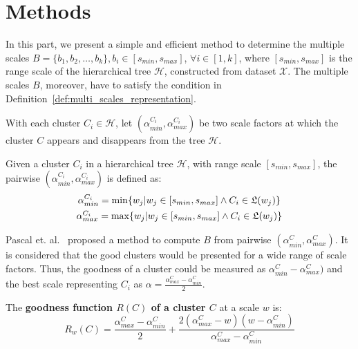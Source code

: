\vspace{-2mm}
\section{Methods}
\label{sec:methods}
\vspace{-2mm}
In this part, we present a simple and efficient method to determine the multiple scales $\mathsf{\textit{B}} = \{b_1, b_2, \ldots, b_k\}, b_i \in [s_{min},s_{max}]$, $\forall i \in [1,k]$, where $[s_{min},s_{max}]$ is the range scale of the hierarchical tree $\mathcal{H}$, constructed from dataset $\mathcal{X}$. The multiple scales $\mathsf{\textit{B}}$, moreover, have to satisfy the condition in Definition~\ref{def:multi_scales_representation}.

With each cluster $C_i \in \mathcal{H}$, let $(\alpha_{min}^{C_i},\alpha_{max}^{C_i})$ be two scale factors at which the cluster $C$ appears and disappears from the tree $\mathcal{H}$. 
\begin{definition}
\label{def:pairwise_scales} Given a cluster $C_i$ in a hierarchical tree $\mathcal{H}$, with range scale $[s_{min},s_{max}]$, the pairwise $(\alpha_{min}^{C_i},\alpha_{max}^{C_i})$ is defined as:
\begin{equation}
\label{equ:pairwise_scales}
\begin{array}{c}
\alpha_{min}^{C_i}= \min \{w_j | w_j \in [s_{min},s_{max}] \wedge C_i \in \mathfrak{L}(w_j) \} \vspace{1.5mm}\\
\alpha_{max}^{C_i}= \max \{w_j | w_j \in [s_{min},s_{max}] \wedge C_i \in \mathfrak{L}(w_j) \} 

\end{array}
\end{equation}
\end{definition}
Pascal et. al.~\cite{pons2011postprocessing} proposed a method to compute $\mathsf{\textit{B}}$ from pairwise $(\alpha_{min}^C,\alpha_{max}^C)$. It is considered that the good clusters would be presented for a wide range of scale factors. Thus, the goodness of a cluster could be measured as $\alpha_{min}^C - \alpha_{max}^C)$ and the best scale representing $C_i$ as $\alpha = \frac{\alpha_{max}^C-\alpha_{min}^C}{2}$.
\begin{definition}
\label{def:goodness_cluster} The \textbf{goodness function $R(C)$ of a cluster $C$} at a scale $w$ is:
\begin{equation}
\label{equ:goodness_cluster}
R_{w}(C) = \frac{\alpha_{max}^C-\alpha_{min}^C}{2} + \frac{2(\alpha_{max}^C- w)(w - \alpha_{min}^C)}{\alpha_{max}^C-\alpha_{min}^C}
\end{equation}
\end{definition}
